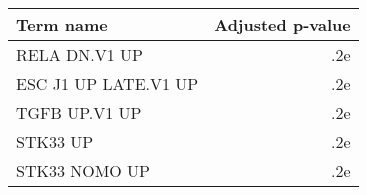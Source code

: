 \begin{tabular}{lr}
\toprule
           Term name &  Adjusted p-value \\
\midrule
       RELA DN.V1 UP &               .2e \\
ESC J1 UP LATE.V1 UP &               .2e \\
       TGFB UP.V1 UP &               .2e \\
            STK33 UP &               .2e \\
       STK33 NOMO UP &               .2e \\
\bottomrule
\end{tabular}
